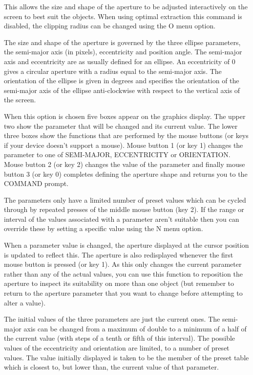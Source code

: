 \documentclass[twoside,11pt]{article}
\renewcommand{\_}{\texttt{\symbol{95}}}
\begin{document}
This allows the size and shape of the aperture to be adjusted
interactively on the screen to best suit the objects. When using
optimal extraction this command is disabled, the clipping radius 
can be changed using the O menu option.

The size and shape of the aperture is governed by the three ellipse
parameters, the semi-major axis (in pixels), eccentricity and position
angle.  The semi-major axis and eccentricity are as usually defined
for an ellipse. An eccentricity of 0 gives a circular aperture with a
radius equal to the semi-major axis. The orientation of the ellipse is
given in degrees and specifies the orientation of the semi-major axis
of the ellipse anti-clockwise with respect to the vertical axis of the
screen.

When this option is chosen five boxes appear on the graphics display.
The upper two show the parameter that will be changed and its current
value. The lower three boxes show the functions that are performed by
the mouse buttons (or keys if your device doesn't support a
mouse). Mouse button 1 (or key 1) changes the parameter to one of
SEMI-MAJOR, ECCENTRICITY or ORIENTATION. Mouse button 2 (or key 2)
changes the value of the parameter and finally mouse button 3 (or key
0) completes defining the aperture shape and returns you to the
COMMAND prompt.

The parameters only have a limited number of
preset values which can be cycled through by repeated presses of the
middle mouse button (key 2).
If the range or interval of the values associated with a parameter
aren't suitable then you can override these by setting a specific
value using the N menu option.

When a parameter value is changed, the aperture displayed at the
cursor position is updated to reflect this. The aperture is also
redisplayed whenever the first mouse button is pressed (or key 1).
As this only changes the current parameter rather than any of the
actual values, you can use this function to reposition the aperture to
inspect its suitability on more than one object (but remember to
return to the aperture parameter that you want to change before
attempting to alter a value).

The initial values of the three parameters are just the current ones.
The semi-major axis can be changed from a maximum of double to a
minimum of a half of the current value (with steps of a tenth or fifth
of this interval).  The possible values of the eccentricity and
orientation are limited, to a number of preset values. The value
initially displayed is taken to be the member of the preset table
which is closest to, but lower than, the current value of that
parameter.
\end{document}
